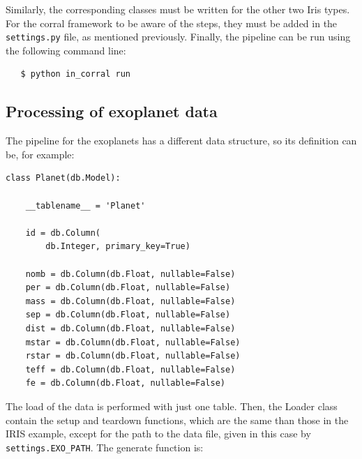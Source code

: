 \documentclass[final,5p,times,twocolumn,authoryear]{elsarticle}
\begin{document}
Similarly, the corresponding classes must be written for the other two
Iris types.
%
For the corral framework to be aware of the steps, they must be added
in the \verb|settings.py| file, as mentioned previously.
%
Finally, the pipeline can be run using the following command line:

\begin{verbatim}
   $ python in_corral run
\end{verbatim}





\subsection{Processing of exoplanet data}
\label{appendix_exo}

The pipeline for the exoplanets has a different data structure, so its
definition can be, for example:

\begin{verbatim}
class Planet(db.Model):

    __tablename__ = 'Planet'

    id = db.Column(
        db.Integer, primary_key=True)

    nomb = db.Column(db.Float, nullable=False)
    per = db.Column(db.Float, nullable=False)
    mass = db.Column(db.Float, nullable=False)
    sep = db.Column(db.Float, nullable=False)
    dist = db.Column(db.Float, nullable=False)
    mstar = db.Column(db.Float, nullable=False)
    rstar = db.Column(db.Float, nullable=False)
    teff = db.Column(db.Float, nullable=False)
    fe = db.Column(db.Float, nullable=False)
\end{verbatim}

The load of the data is performed with just one table.
%
Then, the Loader class contain the setup and teardown functions, which
are the same than those in the IRIS example, except for the path to the
data file, given in this case by \verb|settings.EXO_PATH|.
%
The generate function is:
\end{document}
